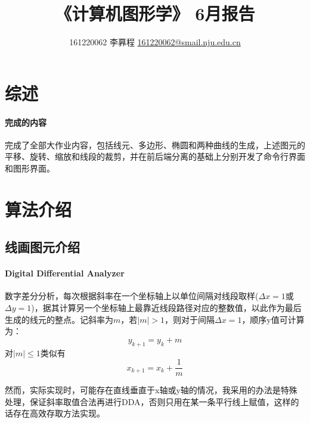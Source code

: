 \documentclass[a4paper,UTF8]{article}
\theoremstyle{definition}
\begin{document}
\title{\textbf{《计算机图形学》 6月报告}}
\author{161220062 李奡程 \href{mailto:xxx@xxx.com}{161220062@smail.nju.edu.cn}}
\maketitle

\section{综述}
\paragraph{完成的内容} 完成了全部大作业内容，包括线元、多边形、椭圆和两种曲线的生成，上述图元的平移、旋转、缩放和线段的裁剪，并在前后端分离的基础上分别开发了命令行界面和图形界面。
\section{算法介绍}
\subsection{线画图元介绍}
\paragraph{Digital Differential Analyzer} 数字差分分析，每次根据斜率在一个坐标轴上以单位间隔对线段取样($\Delta x=1$或$\Delta y=1$)，据其计算另一个坐标轴上最靠近线段路径对应的整数值，以此作为最后生成的线元的整点\cite{graphTextBook}。记斜率为$m$，若$|m|>1$，则对于间隔$\Delta x=1$，顺序y值可计算为：
\begin{equation}
y_{k+1}=y_k+m
\end{equation}
对$|m|\leq 1$类似有
\begin{equation}
x_{k+1}=x_k+\frac{1}{m}
\end{equation}
\par 然而，实际实现时，可能存在直线垂直于x轴或y轴的情况，我采用的办法是特殊处理，保证斜率取值合法再进行DDA，否则只用在某一条平行线上赋值，这样的话存在高效存取方法实现。
\end{document}
